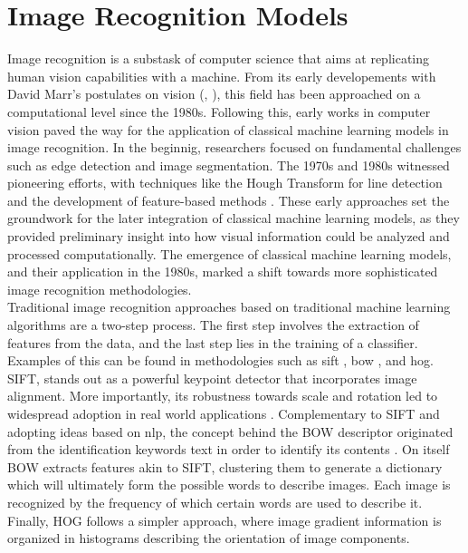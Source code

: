 \section{Image Recognition Models}
\label{rel:sec_imrecon}
Image recognition is a substask of computer science that aims at replicating human vision 
capabilities with a machine. From its early developements  with David Marr's postulates 
on vision (\cite{poggio1981marr}, \cite{marr2010vision}), this field has been approached on a 
computational level since the 1980s. Following this, early works in computer vision 
paved the way for the application of classical machine learning models in image recognition. In 
the beginnig, researchers focused on fundamental challenges such as edge detection and image 
segmentation. The 1970s and 1980s witnessed pioneering efforts, with 
techniques like the Hough Transform for line detection and the development of feature-based 
methods \autocite{duda1972use}. These early approaches set the groundwork for the later integration 
of classical machine learning models, as they provided preliminary insight into how visual 
information could be analyzed and processed computationally. The emergence of classical machine 
learning models, and their application in the 1980s, marked a shift towards more sophisticated 
image recognition methodologies.\\

\noindent Traditional image recognition approaches based on traditional machine learning 
algorithms are a two-step process. The first step involves the extraction of features from the 
data, and the last step lies in the training of a classifier. Examples of this 
can be found in methodologies such as \gls{sift} \autocite{lowe1999object}, \gls{bow} 
\autocite{csurka2004visual}, and \gls{hog}. 
SIFT, stands out as a powerful keypoint detector that incorporates image alignment. 
More importantly, its robustness towards scale and rotation led to widespread adoption in real 
world applications \autocite{cruz2012scale}.
Complementary to SIFT and adopting ideas based on \gls{nlp}, the concept behind the BOW descriptor 
originated from the identification keywords text in order to identify its contents 
\autocite{harris1954distributional}. On itself BOW extracts features akin to SIFT, clustering them 
to generate a dictionary which will ultimately form the possible words to describe images. Each 
image is recognized by the frequency of which certain words are used to describe it.
Finally, HOG follows a simpler approach, where image gradient information is organized in histograms 
describing the orientation of image components. \\ 

